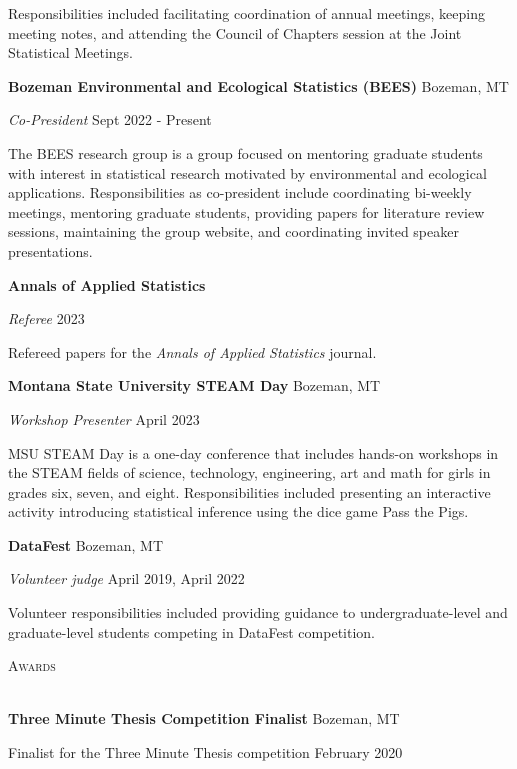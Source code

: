 \documentclass[a4paper]{article}
\newcommand{\lineunder} {
	\vspace*{-8pt} \\
	\hspace*{-18pt} \hrulefill \\
}
\newcommand{\header} [1] {
	{\hspace*{-18pt}\vspace*{6pt} \textcolor{Cerulean}{\textsc{#1}}}
	\vspace*{-6pt} \textcolor{Cerulean}{\lineunder}
}
\begin{document}
Responsibilities included facilitating coordination of annual meetings,
keeping meeting notes, and attending the Council of Chapters session at
the Joint Statistical Meetings. \vspace*{2mm}

\textbf{Bozeman Environmental and Ecological Statistics (BEES)}
\hfill Bozeman, MT

\emph{Co-President} \hfill Sept 2022 - Present

The BEES research group is a group focused on mentoring graduate
students with interest in statistical research motivated by
environmental and ecological applications. Responsibilities as
co-president include coordinating bi-weekly meetings, mentoring graduate
students, providing papers for literature review sessions, maintaining
the group website, and coordinating invited speaker presentations.
\vspace*{2mm}

\textbf{Annals of Applied Statistics}

\emph{Referee} \hfill 2023

Refereed papers for the \emph{Annals of Applied Statistics} journal.
\vspace*{2mm}

\textbf{Montana State University STEAM Day} \hfill Bozeman, MT

\emph{Workshop Presenter} \hfill April 2023

MSU STEAM Day is a one-day conference that includes hands-on workshops
in the STEAM fields of science, technology, engineering, art and math
for girls in grades six, seven, and eight. Responsibilities included
presenting an interactive activity introducing statistical inference
using the dice game Pass the Pigs. \vspace*{2mm}

\textbf{DataFest} \hfill Bozeman, MT

\emph{Volunteer judge} \hfill April 2019, April 2022

Volunteer responsibilities included providing guidance to
undergraduate-level and graduate-level students competing in DataFest
competition. \vspace*{2mm}

\header{Awards}
\vspace*{2mm}

\textbf{Three Minute Thesis Competition Finalist} \hfill Bozeman, MT

Finalist for the Three Minute Thesis competition \hfill February 2020
\end{document}
